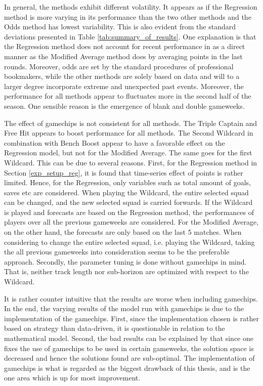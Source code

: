 \newpar 

In general, the methods exhibit different volatility. It appears as if the Regression method is more varying in its performance than the two other methods and the Odds method has lowest variability. This is also evident from the standard deviations presented in Table \ref{tab:summary_of_results}. One explanation is that the Regression method does not account for recent performance in as a direct manner as the Modified Average method does by averaging points in the last rounds. Moreover, odds are set by the standard procedures of professional bookmakers, while the other methods are solely based on data and will to a larger degree incorporate extreme and unexpected past events. Moreover, the performance for all methods appear to fluctuates more in the second half of the season. One sensible reason is the emergence of blank and double gameweeks. 

\newpar

The effect of gamechips is not consistent for all methods. The Triple Captain and Free Hit appears to boost performance for all methods. The Second Wildcard in combination with Bench Boost appear to have a favorable effect on the Regression model, but not for the Modified Average. The same goes for the first Wildcard. This can be due to several reasons. First, for the Regression method in Section \ref{exp_setup_reg}, it is found that time-series effect of points is rather limited. Hence, for the Regression, only variables such as total amount of goals, saves etc are considered. When playing the Wildcard, the entire selected squad can be changed, and the new selected squad is carried forwards. If the Wildcard is played and forecasts are based on the Regression method, the performances of players over all the previous gameweeks are considered. For the Modified Average, on the other hand, the forecasts are only based on the last 5 matches. When considering to change the entire selected squad, i.e. playing the Wildcard, taking the all previous gameweeks into consideration seems to be the preferable approach. Secondly, the parameter tuning is done without gamechips in mind. That is, neither track length nor sub-horizon are optimized with respect to the Wildcard.

It is rather counter intuitive that the results are worse when including gamechips. In the end, the varying results of the model run with gamechips is due to the implementation of the gamechips.  First, since the implementation chosen is rather based on strategy than data-driven, it is questionable in relation to the mathematical model. Second, the bad results can be explained by that since one fixes the use of gamechips to be used in certain gameweeks, the solution space is decreased and hence the solutions found are sub-optimal. The implementation of gamechips is what is regarded as the biggest drawback of this thesis, and is the one area which is up for most improvement.


